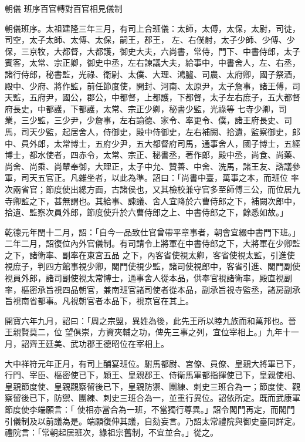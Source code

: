 
\begin{pinyinscope}

 朝儀
 班序百官轉對百官相見儀制



 朝儀班序。太祖建隆三年三月，有司上合班儀：太師，太傅，太保，太尉，司徒，司空，太子太師、太傅、太保，嗣王，郡王，
 左、右僕射，太子少師、少傅、少保，三京牧，大都督，大都護，御史大夫，六尚書，常侍，門下、中書侍郎，太子賓客，太常、宗正卿，御史中丞，左右諫議大夫，給事中，中書舍人，左、右丞，諸行侍郎，秘書監，光祿、衛尉、太僕、大理、鴻臚、司農、太府卿，國子祭酒，殿中、少府、將作監，前任節度使，開封、河南、太原尹，太子詹事，諸王傅，司天監，五府尹，國公，郡公，中都督，上都護，下都督，太子左右庶子，五大都督府長史，中都護，下都護，太常、宗正少卿，秘書少監，光祿等
 七寺少卿，司業，三少監，三少尹，少詹事，左右諭德、家令、率更令、僕，諸王府長史、司馬，司天少監，起居舍人，侍御史，殿中侍御史，左右補闕、拾遺，監察御史，郎中、員外郎，太常博士，五府少尹，五大都督府司馬，通事舍人，國子博士，五經博士，都水使者，四赤令，太常、宗正、秘書丞，著作郎，殿中丞，尚食、尚藥、尚舍、尚乘、尚輦奉御，大理正，太子中允、贊善、中舍、洗馬，諸王友、諮議參軍，司天五官正。凡雜坐者，以此為準。詔曰：「尚書中臺，萬事之本，而班位
 率次兩省官；節度使出總方面，古諸侯也，又其檢校兼守官多至師傅三公，而位居九寺卿監之下，甚無謂也。其給事、諫議、舍人宜降於六曹侍郎之下，補闕次郎中，拾遺、監察次員外郎，節度使升於六曹侍郎之上、中書侍郎之下，餘悉如故。」



 乾德元年閏十二月，詔：「自今一品致仕官曾帶平章事者，朝會宜綴中書門下班。」二年二月，詔復位內外官儀制。有司請令上將軍在中書侍郎之下，大將軍在少卿監之下，諸衛率、副率在東宮五品
 之下，內客省使視太卿，客省使視太監，引進使視庶子，判四方館事視少卿，閣門使視少監，諸司使視郎中，客省引進、閣門副使視員外郎，諸司副使視太常博士，通事舍人從本品，供奉官視諸衛率，殿直視副率，樞密承旨視四品朝官，兼南班官諸司使者從本品，副承旨視寺監丞，諸房副承旨視南省都事。凡視朝官者本品下，視京官在其上。



 開寶六年九月，詔曰：「周之宗盟，異姓為後，此先王所以睦九族而和萬邦也。晉王親賢莫二，位
 望俱崇，方資夾輔之功，俾先三事之列，宜位宰相上。」九年十一月，詔齊王廷美、武功郡王德昭位在宰相上。



 大中祥符元年正月，有司上酺宴班位。駙馬都尉、宮僚、員僚、皇親大將軍已下，行門、宰臣、樞密使已下，穎王、皇親郡王、侍衛馬軍都指揮使已下，皇親使相、皇親節度使、皇親觀察留後已下，皇親防禦、團練、刺史三班合為一；節度使、觀察留後已下，防禦、團練、刺史三班合為一，並重行異位。詔依所定。既而武康軍節度使李端願言：「
 使相亦當合為一班，不當獨行尊異。」詔令閣門再定，而閣門引儀制及以前議為是。端願復伸其議，自劾妄言。乃詔太常禮院與御史臺同詳定。禮院言：「常朝起居班次，緣祖宗舊制，不宜並合。」從之。




\end{pinyinscope}
